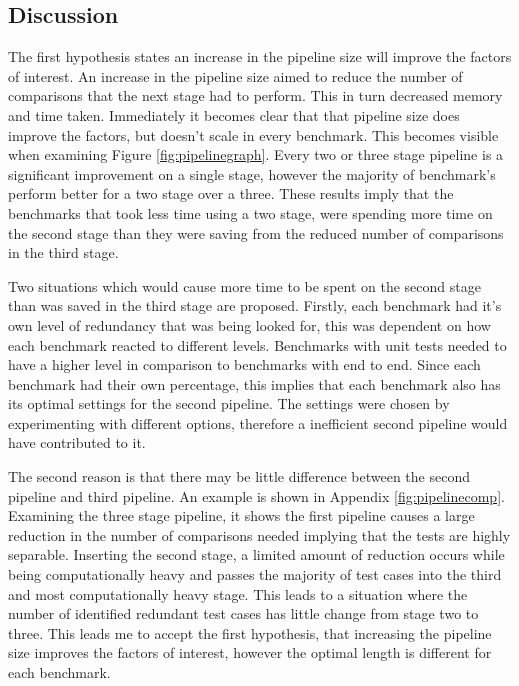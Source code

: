\subsection{Discussion}

The first hypothesis states an increase in the pipeline size will improve the factors of interest. An increase in the pipeline size aimed to reduce the number of comparisons that the next stage had to perform. This in turn decreased memory and time taken. Immediately it becomes clear that that pipeline size does improve the factors, but doesn't scale in every benchmark. This becomes visible when examining Figure \ref{fig:pipelinegraph}. Every two or three stage pipeline is a significant improvement on a single stage, however the majority of benchmark's perform better for a two stage over a three. These results imply that the benchmarks that took less time using a two stage, were spending more time on the second stage than they were saving from the reduced number of comparisons in the third stage. 

Two situations which would cause more time to be spent on the second stage than was saved in the third stage are proposed. Firstly, each benchmark had it's own level of redundancy that was being looked for, this was dependent on how each benchmark reacted to different levels. Benchmarks with unit tests needed to have a higher level in comparison to benchmarks with end to end. Since each benchmark had their own percentage, this implies that each benchmark also has its optimal settings for the second pipeline. The settings were chosen by experimenting with different options, therefore a inefficient second pipeline would have contributed to it.

The second reason is that there may be little difference between the second pipeline and third pipeline. An example is shown in Appendix \ref{fig:pipelinecomp}. Examining the three stage pipeline, it shows the first pipeline causes a large reduction in the number of comparisons needed implying that the tests are highly separable. Inserting the second stage, a limited amount of reduction occurs while being computationally heavy and passes the majority of test cases into the third and most computationally heavy stage.  This leads to a situation where the number of identified redundant test cases has little change from stage two to three. This leads me to accept the first hypothesis, that increasing the pipeline size improves the factors of interest, however the optimal length is different for each benchmark.

